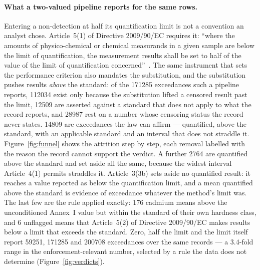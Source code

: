 \paragraph{What a two-valued pipeline reports for the same rows.}
Entering a non-detection at half its quantification limit is not a convention an
analyst chose. Article~5(1) of Directive 2009/90/EC requires it: ``where the
amounts of physico-chemical or chemical measurands in a given sample are below
the limit of quantification, the measurement results shall be set to half of the
value of the limit of quantification concerned''~\cite{eu2009qaqc}. The same
instrument that sets the performance criterion also mandates the substitution,
and the substitution pushes results \emph{above} the standard: of the \num{171285}
exceedances such a pipeline reports, \num{112034} exist only because the
substitution lifted a censored result past the limit, \num{12509} are asserted
against a standard that does not apply to what the record reports, and
\num{28987} rest on a number whose censoring status the record never states.
\num{14809} are exceedances the law can affirm --- quantified, above the
standard, with an applicable standard and an interval that does not straddle it.
Figure~\ref{fig:funnel} shows the attrition step by step, each removal labelled
with the reason the record cannot support the verdict.
A further \num{2764} are quantified above the standard and set aside all the
same, because the widest interval Article~4(1) permits straddles it. Article~3(3b)
sets aside no quantified result: it reaches a value reported as below the
quantification limit, and a mean quantified above the standard is evidence of
exceedance whatever the method's limit was. The last few are the rule applied
exactly: \num{176} cadmium means above the unconditioned Annex~I value but within
the standard of their own hardness class, and \num{6} unflagged means that
Article~5(2) of Directive 2009/90/EC makes results below a limit that exceeds
the standard. Zero, half the limit and the limit
itself report \num{59251}, \num{171285} and \num{200708} exceedances over the
same records --- a \num{3.4}-fold range in the enforcement-relevant number,
selected by a rule the data does not determine
(Figure~\ref{fig:verdicts}).

